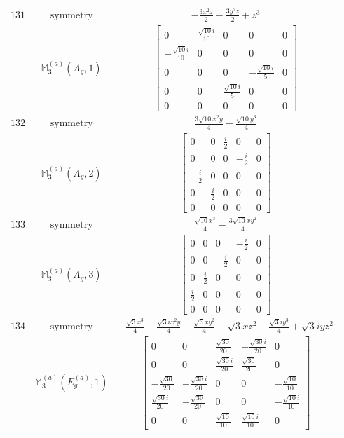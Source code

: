 \documentclass[fleqn,8pt,landscape]{jsarticle}
\begin{document}
\begin{longtable}{ccc}
$ 131 $ & $ \text{symmetry} $ & $ - \frac{3 x^{2} z}{2} - \frac{3 y^{2} z}{2} + z^{3} $ \\
$  $ & $ \mathbb{M}_{3}^{(a)}(A_{g},1) $ & $ \begin{bmatrix} 0 & \frac{\sqrt{10} i}{10} & 0 & 0 & 0 \\ - \frac{\sqrt{10} i}{10} & 0 & 0 & 0 & 0 \\ 0 & 0 & 0 & - \frac{\sqrt{10} i}{5} & 0 \\ 0 & 0 & \frac{\sqrt{10} i}{5} & 0 & 0 \\ 0 & 0 & 0 & 0 & 0 \end{bmatrix} $ \\ \hline
$ 132 $ & $ \text{symmetry} $ & $ \frac{3 \sqrt{10} x^{2} y}{4} - \frac{\sqrt{10} y^{3}}{4} $ \\
$  $ & $ \mathbb{M}_{3}^{(a)}(A_{g},2) $ & $ \begin{bmatrix} 0 & 0 & \frac{i}{2} & 0 & 0 \\ 0 & 0 & 0 & - \frac{i}{2} & 0 \\ - \frac{i}{2} & 0 & 0 & 0 & 0 \\ 0 & \frac{i}{2} & 0 & 0 & 0 \\ 0 & 0 & 0 & 0 & 0 \end{bmatrix} $ \\ \hline
$ 133 $ & $ \text{symmetry} $ & $ \frac{\sqrt{10} x^{3}}{4} - \frac{3 \sqrt{10} x y^{2}}{4} $ \\
$  $ & $ \mathbb{M}_{3}^{(a)}(A_{g},3) $ & $ \begin{bmatrix} 0 & 0 & 0 & - \frac{i}{2} & 0 \\ 0 & 0 & - \frac{i}{2} & 0 & 0 \\ 0 & \frac{i}{2} & 0 & 0 & 0 \\ \frac{i}{2} & 0 & 0 & 0 & 0 \\ 0 & 0 & 0 & 0 & 0 \end{bmatrix} $ \\ \hline
$ 134 $ & $ \text{symmetry} $ & $ - \frac{\sqrt{3} x^{3}}{4} - \frac{\sqrt{3} i x^{2} y}{4} - \frac{\sqrt{3} x y^{2}}{4} + \sqrt{3} x z^{2} - \frac{\sqrt{3} i y^{3}}{4} + \sqrt{3} i y z^{2} $ \\
$  $ & $ \mathbb{M}_{3}^{(a)}(E_{g}^{(a)},1) $ & $ \begin{bmatrix} 0 & 0 & \frac{\sqrt{30}}{20} & - \frac{\sqrt{30} i}{20} & 0 \\ 0 & 0 & \frac{\sqrt{30} i}{20} & \frac{\sqrt{30}}{20} & 0 \\ - \frac{\sqrt{30}}{20} & - \frac{\sqrt{30} i}{20} & 0 & 0 & - \frac{\sqrt{10}}{10} \\ \frac{\sqrt{30} i}{20} & - \frac{\sqrt{30}}{20} & 0 & 0 & - \frac{\sqrt{10} i}{10} \\ 0 & 0 & \frac{\sqrt{10}}{10} & \frac{\sqrt{10} i}{10} & 0 \end{bmatrix} $ \\ \hline

\end{longtable}
\end{document}
